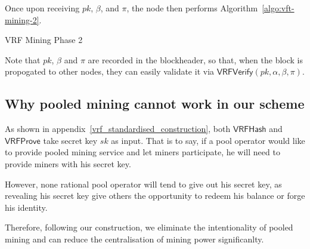 Once upon receiving $pk$, $\beta$, and $\pi$, the node then performs Algorithm~\ref{algo:vft-mining-2}.

\begin{algorithm}[H]
\caption{VRF Mining Phase 2}
\label{algo:vft-mining-2}
\SetAlgoLined
{}
\end{algorithm}

Note that $pk$, $\beta$ and $\pi$ are recorded in the blockheader, so that, when the block is propogated to other nodes, they can easily validate it via $\mathsf{VRFVerify}(pk, \alpha, \beta, \pi)$.



\subsection{Why pooled mining cannot work in our scheme}
\label{sec:discourage-pool}

As shown in appendix~\ref{vrf_standardised_construction}, both $\mathsf{VRFHash}$ and $\mathsf{VRFProve}$ take secret key $sk$ as input.
That is to say, if a pool operator would like to provide pooled mining service and let miners participate, he will need to provide miners with his secret key.

However, none rational pool operator will tend to give out his secret key, as revealing his secret key give others the opportunity to redeem his balance or forge his identity.

Therefore, following our construction, we eliminate the intentionality of pooled mining and can reduce the centralisation of mining power significanlty.

